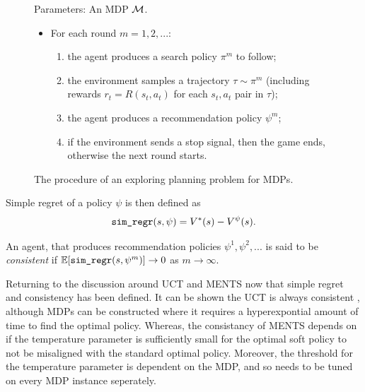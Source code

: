     \begin{figure}
        \begin{tcolorbox}
            Parameters: An MDP $\mathcal{M}$.
            \begin{itemize}
                \item For each round $m=1,2,...$:
                \begin{enumerate}
                    \item the agent produces a search policy $\pi^m$ to follow;
                    \item the environment samples a trajectory $\tau\sim\pi^m$ (including rewards $r_t=R(s_t,a_t)$ for each $s_t,a_t$ pair in $\tau$);
                    \item the agent produces a recommendation policy $\psi^m$;
                    \item if the environment sends a stop signal, then the game ends, otherwise the next round starts.
                \end{enumerate} 
            \end{itemize}
        \end{tcolorbox}
        \caption{The procedure of an exploring planning problem for MDPs.  }
        \label{fig:3:planning_problem}
    \end{figure}

    Simple regret of a policy $\psi$ is then defined as
    \begin{align}
        {\textnormal{\texttt{sim\_regr}}}(s,\psi) = V^*(s)-V^{\psi}(s).
    \end{align}

    An agent, that produces recommendation policies $\psi^1,\psi^2,...$ is said to be \textit{consistent} if $\mathbb{E}[{\textnormal{\texttt{sim\_regr}}}(s,\psi^m)] \rightarrow 0$ as $m\rightarrow \infty$.

    Returning to the discussion around UCT and MENTS now that simple regret and consistency has been defined. It can be shown the UCT is always consistent , although MDPs can be constructed where it requires a hyperexpontial amount of time to find the optimal policy. Whereas, the consistancy of MENTS depends on if the temperature parameter is sufficiently small for the optimal soft policy to not be misaligned with the standard optimal policy. Moreover, the threshold for the temperature parameter is dependent on the MDP, and so needs to be tuned on every MDP instance seperately.
    




